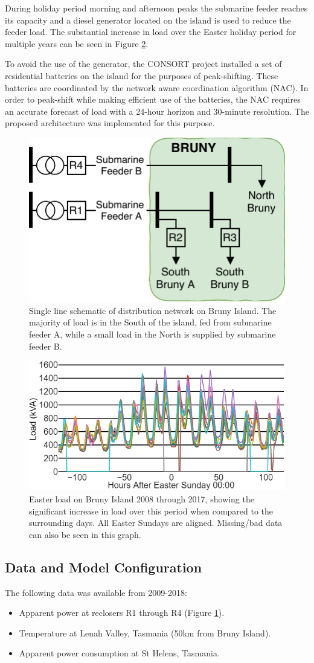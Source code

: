 \documentclass[conference]{IEEEtran}
\begin{document}
During holiday period morning and afternoon peaks the submarine feeder reaches its capacity and a diesel generator located on the island is used to reduce the feeder load.
The substantial increase in load over the Easter holiday period for multiple years can be seen in Figure \ref{fig:bruny_easter}.

To avoid the use of the generator, the CONSORT project installed a set of residential batteries on the island for the purposes of peak-shifting.
These batteries are coordinated by the network aware coordination algorithm (NAC).
In order to peak-shift while making efficient use of the batteries, the NAC requires an accurate forecast of load with a 24-hour horizon and 30-minute resolution.
The proposed architecture was implemented for this purpose.

\begin{figure}[htbp]
	\centerline{\includegraphics[width=.25\textwidth]{images/bruny_single_line.pdf}}
	\caption{Single line schematic of distribution network on Bruny Island.
			 The majority of load is in the South of the island, fed from submarine feeder A, while a small load in the North is supplied by submarine feeder B.}
	\label{fig:bruny_network}
\end{figure}

\begin{figure}[htbp]
	\centerline{\includegraphics[width=.40\textwidth]{images/easter_bruny.png}}
	\caption{Easter load on Bruny Island 2008 through 2017, showing the significant increase in load over this period when compared to the surrounding days. 
		     All Easter Sundays are aligned.
     	     Missing/bad data can also be seen in this graph.}
	\label{fig:bruny_easter}
\end{figure}

\subsection{Data and  Model Configuration}
The following data was available from 2009-2018:
\begin{itemize}
	\item Apparent power at reclosers R1 through R4 (Figure \ref{fig:bruny_network}).
	\item Temperature at Lenah Valley, Tasmania (50km from Bruny Island). 
	\item Apparent power consumption at St Helens, Tasmania.
\end{itemize}
\end{document}
